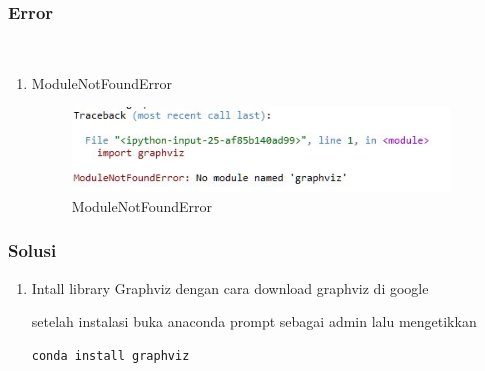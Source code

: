 \subsubsection{Error}
\hfill\\
\begin{enumerate}
\item ModuleNotFoundError

\begin{figure}[H]
\centerline{\includegraphics[width=10cm]{figures/1174089/2/error1.jpg}}
\caption{ModuleNotFoundError}
\label{labelgambar}
\end{figure}
\end{enumerate}

\subsubsection{Solusi}
\begin{enumerate}
\item Intall library Graphviz dengan cara download graphviz di google

setelah instalasi buka anaconda prompt sebagai admin lalu mengetikkan
\begin{lstlisting}
conda install graphviz
\end{lstlisting} 
\end{enumerate}
